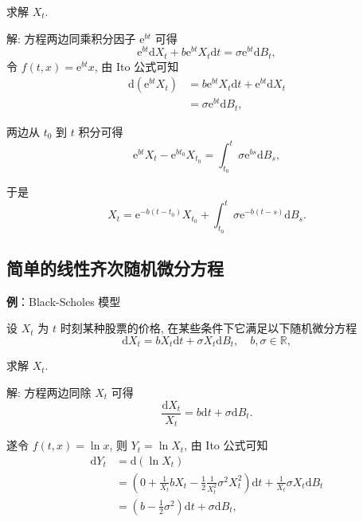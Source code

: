 \documentclass[openany]{ctexbook}
\theoremstyle{kaiti}
\theoremstyle{normal}
\begin{document}
求解 $X_t$.

解: 方程两边同乘积分因子 $\mathrm{e}^{b t}$ 可得
\begin{equation}
  \mathrm{e}^{b t}\mathrm{d}X_t+b\mathrm{e}^{b t} X_t\mathrm{d}t=\sigma\mathrm{e}^{b t}\mathrm{d}B_t,
\end{equation}
令 $f(t,x)=\mathrm{e}^{b t}x$, 由 Ito 公式可知
\begin{equation}
  \begin{aligned}
  \mathrm{d}(\mathrm{e}^{b t}X_t)
  &=b\mathrm{e}^{b t} X_t\mathrm{d}t+\mathrm{e}^{b t}\mathrm{d}X_t\\
  &=\sigma\mathrm{e}^{b t}\mathrm{d}B_t,
  \end{aligned}
\end{equation}

两边从 $t_0$ 到 $t$ 积分可得
\begin{equation}
  \mathrm{e}^{b t}X_t-\mathrm{e}^{b t_0}X_{t_0}=\int_{t_0}^t\sigma\mathrm{e}^{b s}\mathrm{d}B_s,
\end{equation}

于是
\begin{equation}
  X_t=\mathrm{e}^{-b (t-t_0)}X_{t_0}+\int_{t_0}^t\sigma\mathrm{e}^{-b (t-s)}\mathrm{d}B_s.
\end{equation}

\subsection{简单的线性齐次随机微分方程}

\textbf{例}：Black-Scholes 模型

设 $X_t$ 为 $t$ 时刻某种股票的价格, 在某些条件下它满足以下随机微分方程
\begin{equation}
  \mathrm{d}X_t=b X_t\mathrm{d}t+\sigma X_t\mathrm{d}B_t,\quad b,\sigma\in\mathbb{R},
\end{equation}

求解 $X_t$.

解: 方程两边同除 $X_t$ 可得
\begin{equation}
  \frac{\mathrm{d}X_t}{X_t}=b \mathrm{d}t+\sigma \mathrm{d}B_t.
\end{equation}

遂令 $f(t,x)=\ln x$, 则 $Y_t=\ln X_t$, 由 Ito 公式可知
\begin{equation}
  \begin{aligned}
    \mathrm{d}Y_t
    &=\mathrm{d}(\ln X_t)\\
    &=\left(0+\frac{1}{X_t}b X_t-\frac{1}{2}\frac{1}{X_t^2}\sigma^2 X_t^2\right)\mathrm{d}t+\frac{1}{X_t}\sigma X_t\mathrm{d}B_t\\
    &=\left(b-\frac{1}{2}\sigma^2\right)\mathrm{d}t+\sigma\mathrm{d}B_t,\\
  \end{aligned}
\end{equation}
\end{document}
